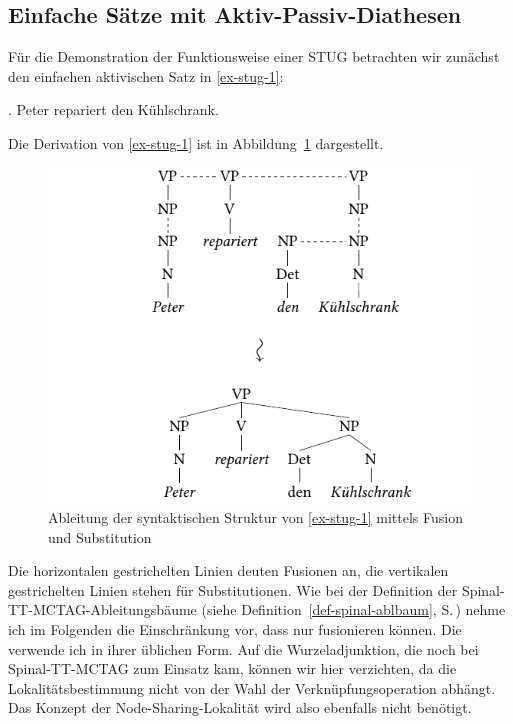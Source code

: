 \subsection{Einfache Sätze mit Aktiv-Passiv-Diathesen} \label{sec-stug-einfach}

Für die Demonstration der Funktionsweise einer STUG betrachten wir zunächst den einfachen aktivischen Satz in \ref{ex-stug-1}: 

\ex. \label{ex-stug-1} Peter repariert den Kühlschrank. 

Die Derivation von \ref{ex-stug-1} ist in Abbildung~\ref{fig-stug-1} dargestellt.
\begin{figure}[t]
\centering
\includegraphics{graphics/abb91.pdf}
\caption{\label{fig-stug-1}Ableitung der syntaktischen Struktur von \ref{ex-stug-1} mittels Fusion und Substitution}
\end{figure}
Die horizontalen gestrichelten Linien deuten Fusionen an, die vertikalen gestrichelten Linien stehen für Substitutionen. Wie bei der Definition der Spinal-TT-MCTAG-Ableitungsbäume (siehe Definition~\ref{def-spinal-ablbaum}, S.\,\pageref{def-spinal-ablbaum}) nehme ich im Folgenden die Einschränkung vor, dass nur  fusionieren können. Die  verwende ich in ihrer üblichen Form. Auf die Wurzeladjunktion, die noch bei Spinal-TT-MCTAG zum Einsatz kam, können wir hier verzichten, da die Lokalitätsbestimmung nicht von der Wahl der Verknüpfungsoperation abhängt. Das Konzept der Node-Sharing-Lokalität wird also ebenfalls nicht benötigt.

